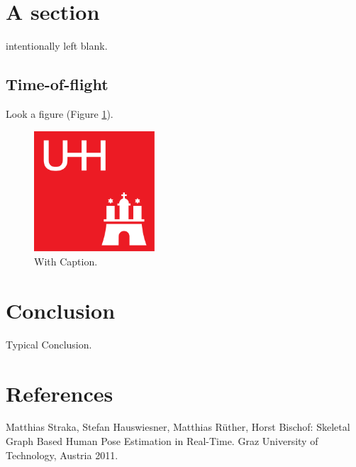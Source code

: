 \documentclass{acmtog} %
\begin{document}
\section{A section}
\label{sec:blank}
intentionally left blank.

\subsection{Time-of-flight}

Look a figure (Figure \ref{fig:figure}).
\begin{figure}[ht]
\centerline{\includegraphics[width=4.5cm]{img/uhh}}
\caption{With Caption.}
    \label{fig:figure}
\end{figure}

\section{Conclusion}
\label{sec:conclusion}

Typical Conclusion.

\section{References}
\renewcommand{\section}[2]{}
\begin{raggedright}%
\begin{thebibliography}{X}
     Matthias Straka, Stefan Hauswiesner, Matthias Rüther, Horst Bischof: Skeletal Graph Based Human Pose Estimation in Real-Time. Graz University of Technology, Austria 2011.
\end{thebibliography}
\end{raggedright}
\end{document}
